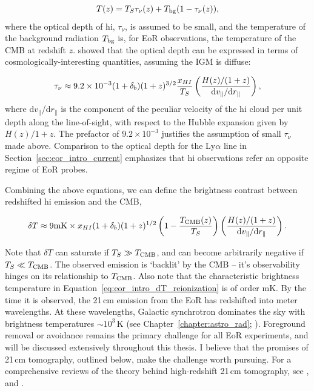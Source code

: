 \begin{equation}
T(z) = T_S \tau_{\nu}(z) + T_{\rm bg}(1-\tau_{\nu}(z)),
\label{eq:eor_intro_brightness_temp}
\end{equation}
where the optical depth of {\sc hi}, $\tau_{\nu}$, is assumed to be small, and the temperature of the background radiation $T_{\rm bg}$ is, for EoR observations, the temperature of the CMB at redshift $z$. \cite{Furlanetto.06} showed that the optical depth can be expressed in terms of cosmologically-interesting quantities, assuming the IGM is diffuse:

\begin{equation}
\tau_{\nu} \approx 9.2\times10^{-3} (1+\delta_b)(1+z)^{3/2}\frac{x_{HI}}{T_S}\left( \frac{H(z)/(1+z)}{{\rm d}v_{\parallel}/{\rm d}r_{\parallel}} \right),
\end{equation}
where d$v_{\parallel}$/d$r_{\parallel}$ is the component of the peculiar velocity of the {\sc hi} cloud per unit depth along the line-of-sight, with respect to the Hubble expansion given by $H(z)/1+z$. The prefactor of $9.2\times10^{-3}$ justifies the assumption of small $\tau_{\nu}$ made above. Comparison to the optical depth for the Ly$\alpha$ line in Section~\ref{sec:eor_intro_current} emphasizes that {\sc hi} observations refer an opposite regime of EoR probes.

Combining the above equations, we can define the brightness contrast between redshifted {\sc hi} emission and the CMB,

\begin{equation}
\delta T \approx 9{\rm mK} \times x_{HI} (1+\delta_b)(1+z)^{1/2} \left( 1 - \frac{T_{\rm CMB}(z)}{T_S} \right)
\left( \frac{H(z)/(1+z)}{{\rm d}v_{\parallel}/{\rm d}r_{\parallel}} \right).
\label{eq:eor_intro_dT_reionization}
\end{equation}

Note that $\delta T$ can saturate if $T_S \gg T_{\rm CMB}$, and can become arbitrarily negative if $T_S \ll T_{\rm CMB}$. The observed emission is `backlit' by the CMB -- it's observability hinges on its relationship to $T_{\rm CMB}$.
Also note that the characteristic brightness temperature in Equation~\ref{eq:eor_intro_dT_reionization} is of order mK. By the time it is observed, the 21\,cm emission from the EoR has redshifted into meter wavelengths. At these wavelengths, Galactic synchrotron dominates the sky with brightness temperatures $\sim 10^3$\,K (see Chapter~\ref{chapter:astro_rad}; \citealt{McQuinn.07}). Foreground removal or avoidance remains the primary challenge for all EoR experiments, and will be discussed extensively throughout this thesis. I believe that the promises of 21\,cm tomography, outlined below, make the challenge worth pursuing. For a comprehensive reviews of the theory behind high-redshift 21\,cm tomography, see \cite{Madau.97}, \cite{Furlanetto.06} and \cite{Pritchard.10}. 

